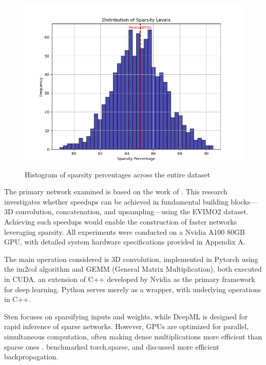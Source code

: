 \documentclass{article}
\begin{document}
\begin{figure}
    \centering
    \includegraphics[width=0.9\linewidth]{figures/Sparse_histogram.png}
    \caption{Histogram of sparsity percentages across the entire dataset}
    \label{Sparse_histogram}
\end{figure}

The primary network examined is based on the work of \cite{hagenaars2021self}. This research investigates whether speedups can be achieved in fundamental building blocks—3D convolution, concatenation, and upsampling—using the EVIMO2 dataset. Achieving such speedups would enable the construction of faster networks leveraging sparsity. All experiments were conducted on a Nvidia A100 80GB GPU, with detailed system hardware specifications provided in Appendix A.

The main operation considered is 3D convolution, implemented in Pytorch using the im2col algorithm and GEMM (General Matrix Multiplication), both executed in CUDA, an extension of C++ developed by Nvidia as the primary framework for deep learning. Python serves merely as a wrapper, with underlying operations in C++.

Sten focuses on sparsifying inputs and weights, while DeepML is designed for rapid inference of sparse networks. However, GPUs are optimized for parallel, simultaneous computation, often making dense multiplications more efficient than sparse ones \cite{ivanov2023sten}. \cite{hosseini2022sparse-benchmark} benchmarked torch.sparse, and \cite{nikdan2023sparseprop} discussed more efficient backpropagation.
\end{document}
